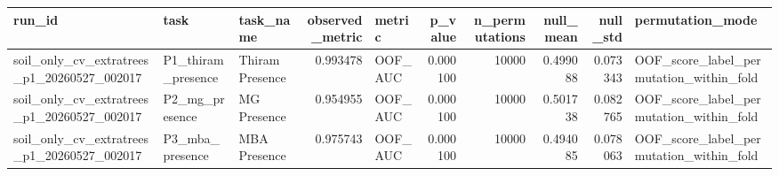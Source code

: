 \begin{tabular}{lllrlrrrrl}
\toprule
run_id & task & task_name & observed_metric & metric & p_value & n_permutations & null_mean & null_std & permutation_mode \\
\midrule
soil_only_cv_extratrees_p1_20260527_002017 & P1_thiram_presence & Thiram Presence & 0.993478 & OOF_AUC & 0.000100 & 10000 & 0.499088 & 0.073343 & OOF_score_label_permutation_within_fold \\
soil_only_cv_extratrees_p1_20260527_002017 & P2_mg_presence & MG Presence & 0.954955 & OOF_AUC & 0.000100 & 10000 & 0.501738 & 0.082765 & OOF_score_label_permutation_within_fold \\
soil_only_cv_extratrees_p1_20260527_002017 & P3_mba_presence & MBA Presence & 0.975743 & OOF_AUC & 0.000100 & 10000 & 0.494085 & 0.078063 & OOF_score_label_permutation_within_fold \\
\bottomrule
\end{tabular}
